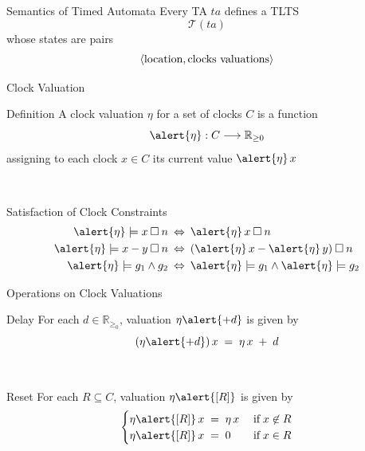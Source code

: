 \documentclass{beamer}
\def\TL#1{\mathcal{T}(#1)}
\begin{document}
\begin{slide}{Semantics of Timed Automata}
Every TA $ta$ defines a TLTS 
\begin{equation*}
\TL{ta}
\end{equation*}
whose states are pairs 
\begin{equation*}
\mathopen{\langle}\text{location}, \text{clocks valuations}\mathclose{\rangle}
\end{equation*}
\end{slide}
\begin{slide}{Clock Valuation}

\begin{block}{Definition}
A clock valuation \alert{$\eta$} for a set of clocks $C$ is a function 
\begin{equation*}
\fdec{\alert{\eta}}{C}{\mathbb{R}_{\geq 0}}
\end{equation*}
assigning to each clock $x \in C$ its current value $\alert{\eta}\, x$
\end{block}
~\\

\begin{block}{Satisfaction of Clock Constraints}
\begin{align*}
\alert{\eta} \models x \mathbin{\square} n \; & \dimp\; \alert{\eta}\, x \mathbin{\square} n\\
\alert{\eta} \models x-y \mathbin{\square} n \; & \dimp\; (\alert{\eta}\, x - \alert{\eta}\, y) \mathbin{\square} n\\
\alert{\eta} \models g_1 \e g_2 \; & \dimp\; \alert{\eta} \models g_1 \e \alert{\eta} \models g_2
\end{align*}
\end{block}
\end{slide}
\begin{slide}{Operations on Clock Valuations}
\begin{block}{Delay}
For each $d \in \mathbb{R}_{\geq_0}$, valuation $\eta \alert{+ d}$ is given by
\begin{equation*}
(\eta \alert{+ d})\, x\; =\; \eta\, x\; +\; d
\end{equation*}
\end{block}
~\\

\begin{block}{Reset}
For each $R \subseteq C$, valuation $\eta\alert{[R]}$ is given by
\begin{equation*}
\begin{cases}
\eta\alert{[R]}\, x\; =\; \eta\, x & \; \text{if}\; x \not\in R\\
\eta\alert{[R]}\, x\; =\; 0 & \; \text{if}\; x \in R
\end{cases}
\end{equation*}
\end{block}
\end{slide}
\end{document}
